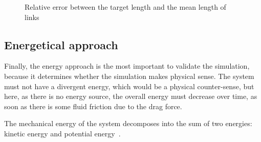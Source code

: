 \begin{figure}[!htb]
    \centering
    
    \caption{Relative error between the target length and the mean length of links}
    \label{fig:error_length}
\end{figure}

\subsection{Energetical approach}

Finally, the energy approach is the most important to validate the simulation, because it determines whether the simulation makes physical sense. The system must not have a divergent energy, which would be a physical counter-sense, but here, as there is no energy source, the overall energy must decrease over time, as soon as there is some fluid friction due to the drag force.

The mechanical energy of the system decomposes into the sum of two energies: kinetic energy and potential energy~\cite{viegas_kinetic_2004}.

